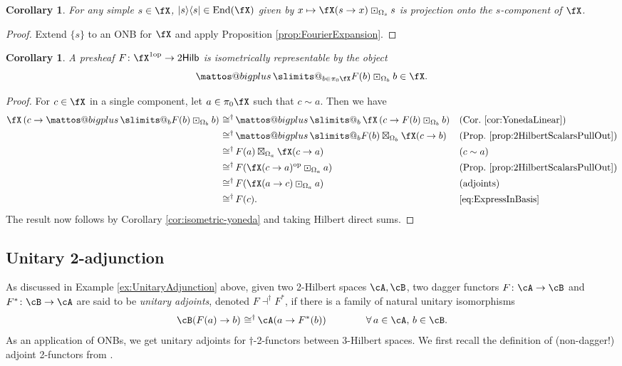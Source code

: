 \documentclass[12pt, reqno]{amsart}
\makeatletter
\DeclareMathOperator{\End}{End}
\newcommand{\op}{\mathrm{op}}
\newcommand{\Hilb}{\mathsf{Hilb}}
\theoremstyle{plain}
\newtheorem{cor}[thm]{Corollary}
\theoremstyle{definition}
\DeclareMathOperator{\isomeq}{\mathbin{\,\cong^\dag}}
\newcommand{\bigboxplus}{%
  \DOTSB\mathop{\mathpalette\mattos@bigplus\relax}\slimits@
}
\newcommand\mattos@bigplus[2]{%
  \vcenter{\hbox{%
    \sbox\z@{$#1\sum$}%
    \resizebox{!}{0.9\dimexpr\ht\z@+\dp\z@}{\raisebox{\depth}{$\m@th#1\boxplus$}}%
  }}%
  \vphantom{\sum}%
}
\makeatother
\begin{document}
\begin{cor}
For any simple $s\in \fX$, $|s\rangle\langle s| \in \End(\fX)$ given by $x\mapsto \fX(s\to x) \boxdot_{\Omega_s} s$ is projection onto the $s$-component of $\fX$.
\end{cor}
\begin{proof}
Extend $\{s\}$ to an ONB for $\fX$ and apply Proposition \ref{prop:FourierExpansion}. 
\end{proof}


\begin{cor}
\label{cor:AllPresheafsRepresentable}
A presheaf $F\colon \fX^{1\op}\to 2\Hilb$ 
is isometrically representable by the object
$$
\bigboxplus_{b\in \pi_0\fX} F(b)\boxdot_{\Omega_b} b
\in \fX.
$$
\end{cor}
\begin{proof}
For $c\in\fX$ in a single component, let $a\in \pi_0\fX$ such that $c\sim a$.
Then we have
\begin{align*}
\fX\left(
c\to 
\bigboxplus_{b} F(b)\boxdot_{\Omega_b} b
\right)
&\isomeq
\bigboxplus_{b}\, \fX\left(
c\to 
F(b)\boxdot_{\Omega_b} b
\right)
&&
\text{(Cor.~\ref{cor:YonedaLinear})}
\\&\isomeq
\bigboxplus_{b}
F(b)
\boxtimes_{\Omega_b}
\fX(c\to b)
&&
\text{(Prop.~\ref{prop:2HilbertScalarsPullOut})}
\\&\isomeq
F(a) \boxtimes_{\Omega_a}
\fX(c\to a)
&&\text{($c\sim a$)}
\\&\isomeq
F(\fX(c\to a)^{\op}\boxdot_{\Omega_a} a)
&&
\text{(Prop.~\ref{prop:2HilbertScalarsPullOut})}
\\&\isomeq
F(\fX(a\to c)\boxdot_{\Omega_a} a)
&&\text{(adjoints)}
\\&\isomeq
F(c).
&&\eqref{eq:ExpressInBasis}
\end{align*}
The result now follows by Corollary \ref{cor:isometric-yoneda} and taking Hilbert direct sums.
\end{proof}





\subsection{Unitary 2-adjunction}\label{subsec:Unitary2Adjunction}
As discussed in Example \ref{ex:UnitaryAdjunction} above, given two 2-Hilbert spaces $\cA,\cB$, two dagger functors $F\colon \cA\to \cB$ and $F^*\colon \cB\to \cA$ are said to be \emph{unitary adjoints}, denoted $F\dashv^\dag F^*$, if there is a family of natural unitary isomorphisms
$$
\cB(F(a)\to b)\isomeq \cA(a\to F^*(b))
\qquad\qquad
\forall\,a\in \cA,\, b\in\cB.
$$
As an application of ONBs, we get unitary adjoints for $\dag$-2-functors between 3-Hilbert spaces.
We first recall the definition of (non-dagger!) adjoint 2-functors from \cite{MR371990}.
\end{document}
